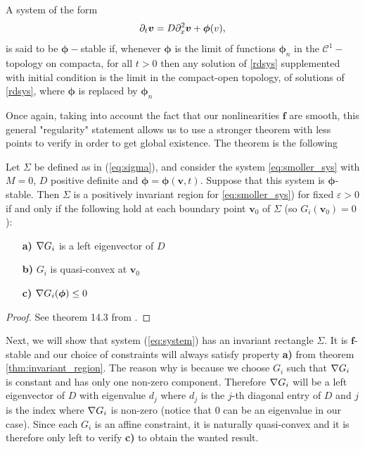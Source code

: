 \begin{definition}
	A system of the form 
	\begin{equation}
		\label{rdsys}
		\partial_t \bm v = D \partial_{x}^2 \bm v + \bm \phi (v),
	\end{equation}
	 is said to be $\bm \phi-$stable if, whenever $\bm\phi$ is the limit of functions $\bm\phi_n$ in the $\mathcal C^1-$topology on compacta, for all $t>0$ then any solution of \ref{rdsys} supplemented with initial condition is the limit in the compact-open topology, of solutions of \ref{rdsys}, where $\bm\phi$ is replaced by $\bm\phi_n$ 
\end{definition}

Once again, taking into account the fact that our nonlinearities $\bm f$ are smooth, this general "regularity" statement allows us to use a stronger theorem with less points to verify in order to get global existence. The theorem is the following 

\begin{theorem}
	\label{thm:invariant_region}
	Let $\Sigma$ be defined as in (\ref{eq:sigma}), and consider the system \ref{eq:smoller_sys} with $M = 0$, $D$ positive definite and $\bm\phi = \bm\phi(\bm v, t)$. Suppose that this system is $\bm\phi$-stable. Then $\Sigma$ is a positively invariant region for \ref{eq:smoller_sys}) for fixed $\varepsilon > 0$ if and only if the following hold at each boundary point $\bm v_0$ of $\Sigma$ (so $G_i(\bm v_0) = 0$):
	
	\begin{itemize}
		\item[\textbf{a)}] $\nabla G_i$ is a left eigenvector of $D$
		\item[\textbf{b)}] $G_i$ is quasi-convex at $\bm v_0$
		\item[\textbf{c)}] $\nabla G_i(\bm \phi) \le 0$
	\end{itemize}
\end{theorem}

\begin{proof}
	See theorem 14.3 from \cite{Smoller1994}.
\end{proof}

Next, we will show that system (\ref{eq:system}) has an invariant rectangle $\Sigma$. It is $\bm f$-stable and our choice of constraints will always satisfy property \textbf{a)} from theorem \ref{thm:invariant_region}. The reason why is because we choose $G_i$ such that $\nabla G_i$ is constant and has only one non-zero component. Therefore $\nabla G_i$ will be a left eigenvector of $D$ with eigenvalue $d_{j}$ where $d_j$ is the $j$-th diagonal entry of $D$ and $j$ is the index where $\nabla G_i$ is non-zero (notice that 0 can be an eigenvalue in our case). Since each $G_i$ is an affine constraint, it is naturally quasi-convex and it is therefore only left to verify \textbf{c)} to obtain the wanted result.


